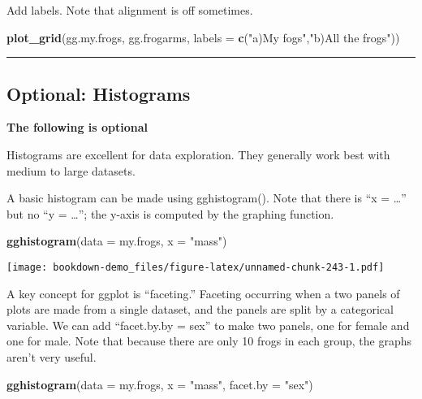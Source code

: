 \documentclass[]{book}
\newenvironment{Shaded}{\begin{snugshade}}{\end{snugshade}}
\newcommand{\KeywordTok}[1]{\textcolor[rgb]{0.13,0.29,0.53}{\textbf{#1}}}
\newcommand{\DataTypeTok}[1]{\textcolor[rgb]{0.13,0.29,0.53}{#1}}
\newcommand{\StringTok}[1]{\textcolor[rgb]{0.31,0.60,0.02}{#1}}
\newcommand{\NormalTok}[1]{#1}
\theoremstyle{definition}
\theoremstyle{definition}
\theoremstyle{definition}
\theoremstyle{remark}
\begin{document}
Add labels. Note that alignment is off sometimes.

\begin{Shaded}
\begin{Highlighting}[]
\KeywordTok{plot_grid}\NormalTok{(gg.my.frogs, }
\NormalTok{          gg.frogarms,}
          \DataTypeTok{labels =} \KeywordTok{c}\NormalTok{(}\StringTok{"a)My fogs"}\NormalTok{,}\StringTok{"b)All the frogs"}\NormalTok{))}
\end{Highlighting}
\end{Shaded}

\begin{center}\rule{0.5\linewidth}{\linethickness}\end{center}

\subsection{Optional: Histograms}\label{optional-histograms}

\textbf{The following is optional}

Histograms are excellent for data exploration. They generally work best
with medium to large datasets.

A basic histogram can be made using gghistogram(). Note that there is
``x = \ldots{}'' but no ``y = \ldots{}''; the y-axis is computed by the
graphing function.

\begin{Shaded}
\begin{Highlighting}[]
\KeywordTok{gghistogram}\NormalTok{(}\DataTypeTok{data =}\NormalTok{ my.frogs, }
            \DataTypeTok{x =} \StringTok{"mass"}\NormalTok{)}
\end{Highlighting}
\end{Shaded}

\texttt{[image: bookdown-demo\_files/figure-latex/unnamed-chunk-243-1.pdf]}

A key concept for ggplot is ``faceting.'' Faceting occurring when a two
panels of plots are made from a single dataset, and the panels are split
by a categorical variable. We can add ``facet.by.by = sex'' to make two
panels, one for female and one for male. Note that because there are
only 10 frogs in each group, the graphs aren't very useful.

\begin{Shaded}
\begin{Highlighting}[]
\KeywordTok{gghistogram}\NormalTok{(}\DataTypeTok{data =}\NormalTok{ my.frogs, }
            \DataTypeTok{x =} \StringTok{"mass"}\NormalTok{,}
            \DataTypeTok{facet.by =} \StringTok{"sex"}\NormalTok{)}
\end{Highlighting}
\end{Shaded}
\end{document}
